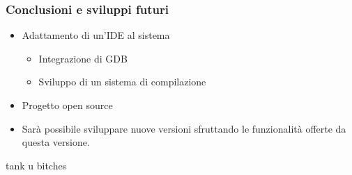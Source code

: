 \documentclass[aspectratio=169,
]{beamer}
\begin{document}
    \begin{frame}
        \frametitle{Conclusioni e sviluppi futuri}
    
        \begin{itemize}
            \item <1-> Adattamento di un'IDE al sistema
            \begin{itemize}
                \item <2-> Integrazione di GDB
                \item <3-> Sviluppo di un sistema di compilazione
            \end{itemize}
            \item <4-> Progetto open source
            \item <5-> Sarà possibile sviluppare nuove versioni sfruttando le funzionalità offerte da questa versione.
        \end{itemize}
    

    \end{frame}

    \appendix
    \begin{frame}
        tank u bitches
    \end{frame}
    
\end{document}
